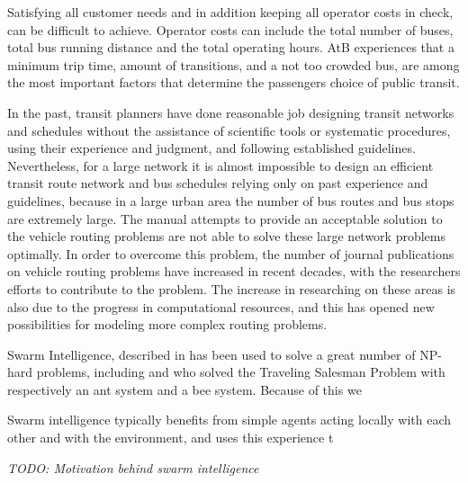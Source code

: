 Satisfying all customer needs and in addition keeping all operator costs in check, can be difficult to achieve. Operator costs can include the total number of buses, total bus running distance and the total operating hours. AtB experiences that a minimum trip time, amount of transitions, and a not too crowded bus, are among the most important factors that determine the passengers choice of public transit.

In the past, transit planners have done reasonable job designing transit networks and schedules without the assistance of scientific tools or systematic procedures, using their experience and judgment, and following established guidelines. Nevertheless, for a large network it is almost impossible to design an efficient transit route network and bus schedules relying only on past experience and guidelines, because in a large urban area the number of bus routes and bus stops are extremely large. The manual attempts to provide an acceptable solution to the vehicle routing problems are not able to solve these large network problems optimally. In order to overcome this problem, the number of journal publications on vehicle routing problems have increased in recent decades, with the researchers efforts to contribute to the problem.  The increase in researching on these areas is also due to the progress in computational resources, and this has opened new possibilities for modeling more complex routing problems.

Swarm Intelligence, described in  has been used to solve a great number of NP-hard problems, including \citet{dorigo97} and \citet{lucic03} who solved the Traveling Salesman Problem with respectively an ant system and a bee system. Because of this we 

Swarm intelligence typically benefits from simple agents acting locally with each other and with the environment, and uses this experience t


\emph{\color{blue} TODO: Motivation behind swarm intelligence}
  

